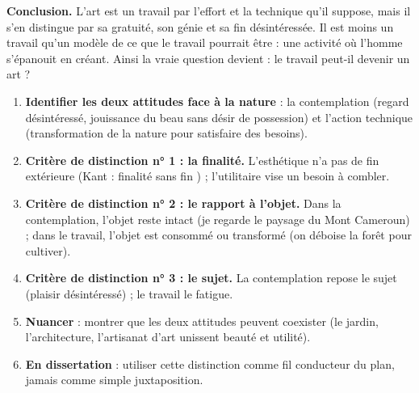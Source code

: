 \documentclass[11pt]{article}
\newcommand{\cle}[1]{{\popxbold\color{popdark}#1}}
\begin{document}
\begin{exoresolu}
\textbf{Conclusion.} L'art est un travail par l'effort et la technique qu'il suppose, mais il s'en distingue par sa gratuité, son génie et sa fin désintéressée. Il est moins un travail qu'un modèle de ce que le travail pourrait être : une activité où l'homme s'épanouit en créant. Ainsi la vraie question devient : le travail peut-il devenir un art ?
\end{exoresolu}

\begin{methode}
\begin{enumerate}
\item \textbf{Identifier les deux attitudes face à la nature} : la \cle{contemplation} (regard désintéressé, jouissance du beau sans désir de possession) et l'\cle{action technique} (transformation de la nature pour satisfaire des besoins).
\item \textbf{Critère de distinction n° 1 : la finalité.} L'esthétique n'a pas de fin extérieure (Kant : \guillemotleft finalité sans fin \guillemotright) ; l'utilitaire vise un besoin à combler.
\item \textbf{Critère de distinction n° 2 : le rapport à l'objet.} Dans la contemplation, l'objet reste intact (je regarde le paysage du Mont Cameroun) ; dans le travail, l'objet est consommé ou transformé (on déboise la forêt pour cultiver).
\item \textbf{Critère de distinction n° 3 : le sujet.} La contemplation repose le sujet (plaisir désintéressé) ; le travail le fatigue.
\item \textbf{Nuancer} : montrer que les deux attitudes peuvent coexister (le jardin, l'architecture, l'artisanat d'art unissent beauté et utilité).
\item \textbf{En dissertation} : utiliser cette distinction comme fil conducteur du plan, jamais comme simple juxtaposition.
\end{enumerate}
\end{methode}
\end{document}
